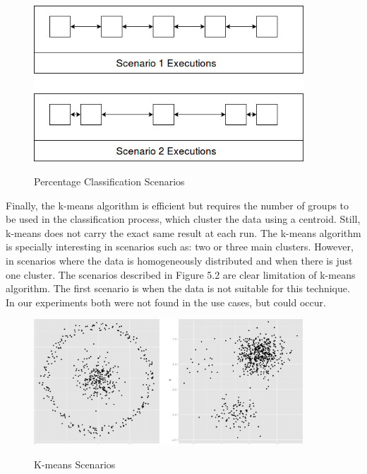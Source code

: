  \begin{figure}[h]
          \center
          \caption{Percentage Classification Scenarios}
            \includegraphics[width=0.90\textwidth]{figures/scenarios_percentage.jpg}
            \label{fig:scenarios_percentage}
    \end{figure}

Finally, the k-means algorithm is efficient but requires the number of groups to be used in the classification process, which cluster the data using a centroid. Still, k-means does not carry the exact same result at each run.
The k-means algorithm is specially interesting in scenarios such as: two or three main clusters. However, in scenarios where the data is homogeneously distributed and when there is just one cluster.
The scenarios described in Figure 5.2 are clear limitation of k-means algorithm. The first scenario is when the data is not suitable for this technique. In our experiments both were not found in the use cases, but could occur.\\
 
 \begin{figure}[h]
          \center
          \caption{K-means Scenarios }
            \includegraphics[width=0.90\textwidth]{figures/scenarios_k.png}
            \label{fig:scenarios_k}
    \end{figure}


